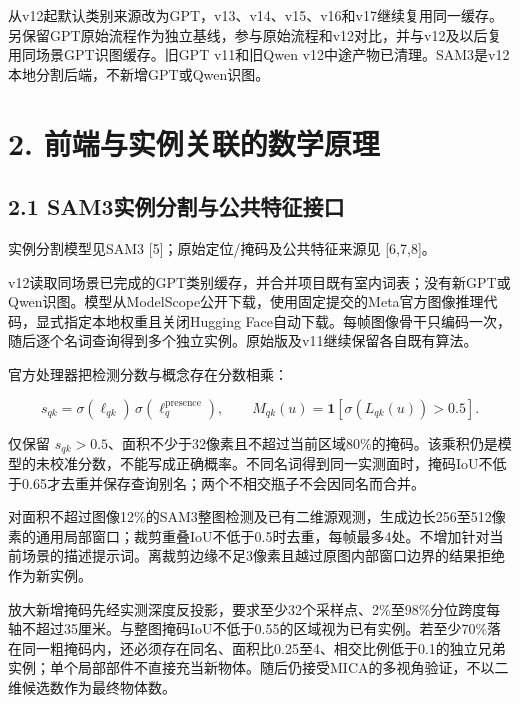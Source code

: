 \documentclass[UTF8,fontset=fandol]{ctexart}
\begin{document}
从v12起默认类别来源改为GPT，v13、v14、v15、v16和v17继续复用同一缓存。另保留GPT原始流程作为独立基线，参与原始流程和v12对比，并与v12及以后复用同场景GPT识图缓存。旧GPT v11和旧Qwen v12中途产物已清理。SAM3是v12本地分割后端，不新增GPT或Qwen识图。



\section*{2. 前端与实例关联的数学原理}

\subsection*{2.1 SAM3实例分割与公共特征接口}

实例分割模型见SAM3 [5]；原始定位/掩码及公共特征来源见 [6,7,8]。



v12读取同场景已完成的GPT类别缓存，并合并项目既有室内词表；没有新GPT或Qwen识图。模型从ModelScope公开下载，使用固定提交的Meta官方图像推理代码，显式指定本地权重且关闭Hugging Face自动下载。每帧图像骨干只编码一次，随后逐个名词查询得到多个独立实例。原始版及v11继续保留各自既有算法。



官方处理器把检测分数与概念存在分数相乘：



\[
s_{qk}=\sigma(\ell_{qk})\,\sigma(\ell_q^{\mathrm{presence}}),\qquad
M_{qk}(u)=\mathbf1[\sigma(L_{qk}(u))>0.5].
\]

仅保留 $s_{qk}>0.5$、面积不少于32像素且不超过当前区域80\%的掩码。该乘积仍是模型的未校准分数，不能写成正确概率。不同名词得到同一实测面时，掩码IoU不低于0.65才去重并保存查询别名；两个不相交瓶子不会因同名而合并。



对面积不超过图像12\%的SAM3整图检测及已有二维源观测，生成边长256至512像素的通用局部窗口；裁剪重叠IoU不低于0.5时去重，每帧最多4处。不增加针对当前场景的描述提示词。离裁剪边缘不足3像素且越过原图内部窗口边界的结果拒绝作为新实例。



放大新增掩码先经实测深度反投影，要求至少32个采样点、2\%至98\%分位跨度每轴不超过35厘米。与整图掩码IoU不低于0.55的区域视为已有实例。若至少70\%落在同一粗掩码内，还必须存在同名、面积比0.25至4、相交比例低于0.1的独立兄弟实例；单个局部部件不直接充当新物体。随后仍接受MICA的多视角验证，不以二维候选数作为最终物体数。
\end{document}
